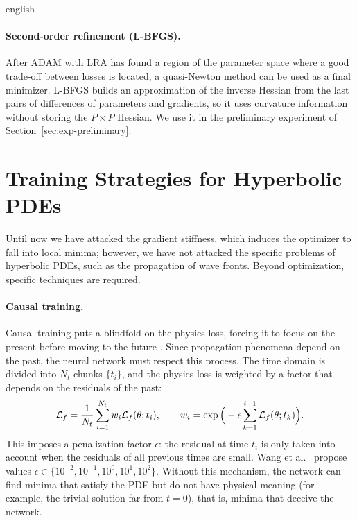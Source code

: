 \documentclass[../0000.tex]{subfiles}
\begin{document}
\begin{hyphenrules}{english}
\paragraph{Second-order refinement (L-BFGS).}
After ADAM with LRA has found a region of the parameter space where a good trade-off between losses is
located, a quasi-Newton method can be used as a final minimizer. L-BFGS builds an approximation of the
inverse Hessian from the last pairs of differences of parameters and gradients, so it uses curvature
information without storing the $P\times P$ Hessian. We use it in the preliminary experiment of Section~\ref{sec:exp-preliminary}.

\section{Training Strategies for Hyperbolic PDEs}\label{sec:training-strategies}

Until now we have attacked the gradient stiffness, which induces the optimizer to fall into local minima;
however, we have not attacked the specific problems of hyperbolic PDEs, such as the propagation of wave
fronts. Beyond optimization, specific techniques are required.

\paragraph{Causal training.}
Causal training puts a blindfold on the physics loss, forcing it to focus on the present before moving
to the future \cite{wang2024causality}. Since propagation phenomena depend on the past, the neural
network must respect this process. The time domain is divided into $N_t$ chunks $\{t_i\}$, and the
physics loss is weighted by a factor that depends on the residuals of the past:
\begin{equation}
  \mathcal{L}_f=\frac{1}{N_t}\sum_{i=1}^{N_t}w_i\mathcal{L}_f(\theta;t_i),\qquad
  w_i=\exp\Big(-\epsilon\sum_{k=1}^{i-1}\mathcal{L}_f(\theta;t_k)\Big).
  \label{eq:causal}
\end{equation}
This imposes a penalization factor $\epsilon$: the residual at time $t_i$ is only taken into account when
the residuals of all previous times are small. Wang et al.~\cite{wang2024causality} propose values
$\epsilon\in\{10^{-2},10^{-1},10^{0},10^{1},10^{2}\}$. Without this mechanism, the network can find
minima that satisfy the PDE but do not have physical meaning (for example, the trivial solution far from
$t=0$), that is, minima that deceive the network.


\end{hyphenrules}
\end{document}

